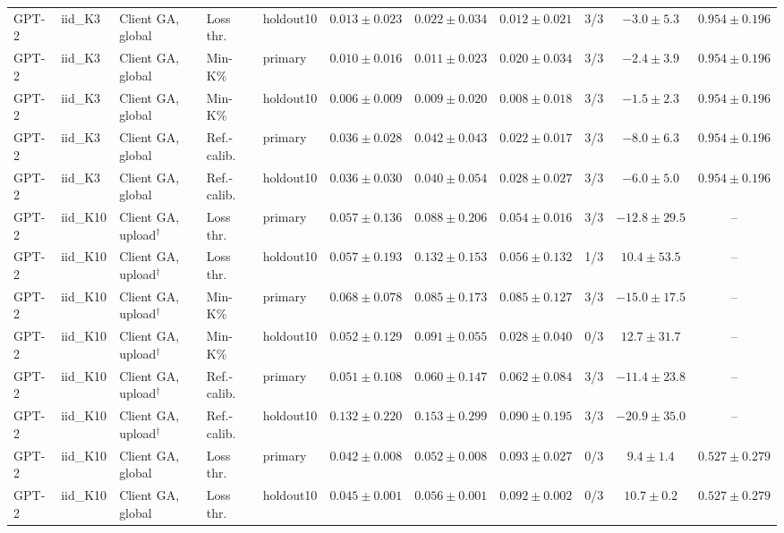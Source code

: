 {\begin{longtable}{@{\extracolsep{\fill}}lllllcccccc@{}}
GPT-2 & iid\_K3 & Client GA, global & Loss thr. & holdout10 & $0.013 \pm 0.023$ & $0.022 \pm 0.034$ & $0.012 \pm 0.021$ & 3/3 & $-3.0 \pm 5.3$ & $0.954 \pm 0.196$ \\
GPT-2 & iid\_K3 & Client GA, global & Min-K\% & primary & $0.010 \pm 0.016$ & $0.011 \pm 0.023$ & $0.020 \pm 0.034$ & 3/3 & $-2.4 \pm 3.9$ & $0.954 \pm 0.196$ \\
GPT-2 & iid\_K3 & Client GA, global & Min-K\% & holdout10 & $0.006 \pm 0.009$ & $0.009 \pm 0.020$ & $0.008 \pm 0.018$ & 3/3 & $-1.5 \pm 2.3$ & $0.954 \pm 0.196$ \\
GPT-2 & iid\_K3 & Client GA, global & Ref.-calib. & primary & $0.036 \pm 0.028$ & $0.042 \pm 0.043$ & $0.022 \pm 0.017$ & 3/3 & $-8.0 \pm 6.3$ & $0.954 \pm 0.196$ \\
GPT-2 & iid\_K3 & Client GA, global & Ref.-calib. & holdout10 & $0.036 \pm 0.030$ & $0.040 \pm 0.054$ & $0.028 \pm 0.027$ & 3/3 & $-6.0 \pm 5.0$ & $0.954 \pm 0.196$ \\
GPT-2 & iid\_K10 & Client GA, upload$^{\dagger}$ & Loss thr. & primary & $0.057 \pm 0.136$ & $0.088 \pm 0.206$ & $0.054 \pm 0.016$ & 3/3 & $-12.8 \pm 29.5$ & -- \\
GPT-2 & iid\_K10 & Client GA, upload$^{\dagger}$ & Loss thr. & holdout10 & $0.057 \pm 0.193$ & $0.132 \pm 0.153$ & $0.056 \pm 0.132$ & 1/3 & $10.4 \pm 53.5$ & -- \\
GPT-2 & iid\_K10 & Client GA, upload$^{\dagger}$ & Min-K\% & primary & $0.068 \pm 0.078$ & $0.085 \pm 0.173$ & $0.085 \pm 0.127$ & 3/3 & $-15.0 \pm 17.5$ & -- \\
GPT-2 & iid\_K10 & Client GA, upload$^{\dagger}$ & Min-K\% & holdout10 & $0.052 \pm 0.129$ & $0.091 \pm 0.055$ & $0.028 \pm 0.040$ & 0/3 & $12.7 \pm 31.7$ & -- \\
GPT-2 & iid\_K10 & Client GA, upload$^{\dagger}$ & Ref.-calib. & primary & $0.051 \pm 0.108$ & $0.060 \pm 0.147$ & $0.062 \pm 0.084$ & 3/3 & $-11.4 \pm 23.8$ & -- \\
GPT-2 & iid\_K10 & Client GA, upload$^{\dagger}$ & Ref.-calib. & holdout10 & $0.132 \pm 0.220$ & $0.153 \pm 0.299$ & $0.090 \pm 0.195$ & 3/3 & $-20.9 \pm 35.0$ & -- \\
GPT-2 & iid\_K10 & Client GA, global & Loss thr. & primary & $0.042 \pm 0.008$ & $0.052 \pm 0.008$ & $0.093 \pm 0.027$ & 0/3 & $9.4 \pm 1.4$ & $0.527 \pm 0.279$ \\
GPT-2 & iid\_K10 & Client GA, global & Loss thr. & holdout10 & $0.045 \pm 0.001$ & $0.056 \pm 0.001$ & $0.092 \pm 0.002$ & 0/3 & $10.7 \pm 0.2$ & $0.527 \pm 0.279$ \\

\end{longtable}}
